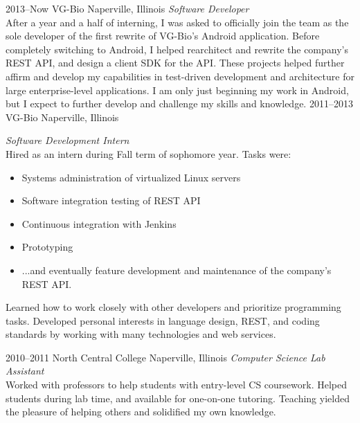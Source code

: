 \documentclass[]{friggeri-cv} %
\begin{document}
\begin{entrylist}
\entry
{2013--Now}
{VG-Bio}
{Naperville, Illinois}
{\emph{Software Developer} \\
    After a year and a half of interning, I was asked to officially join the team as the sole developer of the first rewrite of VG-Bio's Android application.
    Before completely switching to Android, I helped rearchitect and rewrite the company's REST API, and design a client SDK for the API.
    These projects helped further affirm and develop my capabilities in test-driven development and architecture for large enterprise-level applications.
    I am only just beginning my work in Android, but I expect to further develop and challenge my skills and knowledge.
}
\entry
{2011--2013}
{VG-Bio}
{Naperville, Illinois}
{\emph{Software Development Intern} \\
    Hired as an intern during Fall term of sophomore year.
    Tasks were:
    \begin{itemize}
        \item Systems administration of virtualized Linux servers
        \item Software integration testing of REST API
        \item Continuous integration with Jenkins
        \item Prototyping
        \item ...and eventually feature development and maintenance of the company's REST API.
    \end{itemize}
    Learned how to work closely with other developers and prioritize programming tasks.
    Developed personal interests in language design, REST, and coding standards by working with many technologies and web services.}
\entry
{2010--2011}
{North Central College}
{Naperville, Illinois}
{\emph{Computer Science Lab Assistant} \\
Worked with professors to help students with entry-level CS coursework.
Helped students during lab time, and available for one-on-one tutoring.
Teaching yielded the pleasure of helping others and solidified my own knowledge.}
\end{entrylist}
\end{document}
